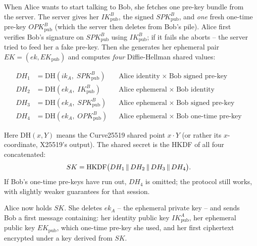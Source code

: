When Alice wants to start talking to Bob, she fetches one pre-key bundle from the server. The server gives her $IK_{\mathrm{pub}}^B$, the signed $SPK_{\mathrm{pub}}^B$, and \emph{one} fresh one-time pre-key $OPK_{\mathrm{pub}}^B$ (which the server then deletes from Bob's pile). Alice first verifies Bob's signature on $SPK_{\mathrm{pub}}^B$ using $IK_{\mathrm{pub}}^B$; if it fails she aborts -- the server tried to feed her a fake pre-key. Then she generates her ephemeral pair $EK = (ek, EK_{\mathrm{pub}})$ and computes \emph{four} Diffie-Hellman shared values:

\begin{align*}
DH_1 &= \mathrm{DH}(ik_A,\; SPK_{\mathrm{pub}}^B) &&\text{Alice identity}\;\times\;\text{Bob signed pre-key}\\
DH_2 &= \mathrm{DH}(ek_A,\; IK_{\mathrm{pub}}^B) &&\text{Alice ephemeral}\;\times\;\text{Bob identity}\\
DH_3 &= \mathrm{DH}(ek_A,\; SPK_{\mathrm{pub}}^B) &&\text{Alice ephemeral}\;\times\;\text{Bob signed pre-key}\\
DH_4 &= \mathrm{DH}(ek_A,\; OPK_{\mathrm{pub}}^B) &&\text{Alice ephemeral}\;\times\;\text{Bob one-time pre-key}
\end{align*}

Here $\mathrm{DH}(x, Y)$ means the Curve25519 shared point $x \cdot Y$ (or rather its $x$-coordinate, X25519's output). The shared secret is the HKDF of all four concatenated:
\[
SK = \mathrm{HKDF}\big(DH_1 \,\|\, DH_2 \,\|\, DH_3 \,\|\, DH_4\big).
\]
If Bob's one-time pre-keys have run out, $DH_4$ is omitted; the protocol still works, with slightly weaker guarantees for that session.

Alice now holds $SK$. She deletes $ek_A$ -- the ephemeral private key -- and sends Bob a first message containing: her identity public key $IK_{\mathrm{pub}}^A$, her ephemeral public key $EK_{\mathrm{pub}}$, which one-time pre-key she used, and her first ciphertext encrypted under a key derived from $SK$.

